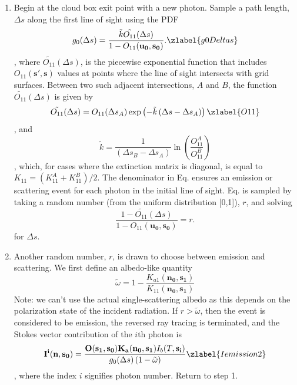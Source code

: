 \begin{enumerate}
\item
Begin at the cloud box exit point with a new photon. Sample a
  path length, $\Delta s$ along the first line of sight using the PDF
\begin{equation}
g_0(\Delta s)=\frac{\tilde{k}\tilde{O_{11}}(\Delta s)}
{1-O_{11}(\mathbf{u_0,s_0})}.
\zlabel{g0Deltas}
\end{equation}
, where $\tilde{O_{11}}(\Delta s)$, is the piecewise exponential
function that includes $O_{11}(\mathbf{s',s})$ values at points
where the line of sight intersects with grid surfaces.
Between two such adjacent intersections, $A$ and $B$, the function
$\tilde{O_{11}}(\Delta s)$ is given by
\begin{equation}
\tilde{O_{11}}(\Delta s)=O_{11}(\Delta s_A)\exp\left(-\tilde{k}\left(\Delta s-\Delta
s_A\right)\right)
\zlabel{O11}
\end{equation}
, and
\begin{equation}
\tilde{k}=\frac{1}{\left(\Delta s_B-\Delta s_A\right)}
\ln\left(\frac{O_{11}^A}{O_{11}^B}\right)
\end{equation}
, which, for cases where the extinction matrix is diagonal, is equal to $K_{11}=(K_{11}^A+K_{11}^B)/2$.
The denominator in Eq.  ensures an emission or scattering
event for each photon in the initial line of sight.
Eq.  is sampled by taking a random number (from the
uniform distribution [0,1]), $r$, and solving 
\begin{equation}
\frac{1-\tilde{O_{11}}(\Delta s)}{1-O_{11}(\mathbf{u_0,s_0})}=r.
\end{equation}
for $\Delta s$.
\item
Another random number, $r$, is drawn to choose between emission and scattering.  We first define an albedo-like quantity
\begin{equation}
\tilde{\omega}=1-\frac{K_{a1}(\mathbf{n_{0},s_{1}})}{K_{11}(\mathbf{n_{0},s_{1}})}
\end{equation}
Note: we can't use the actual single-scattering albedo as this depends
on the polarization state of the incident radiation.  If $r>\tilde{\omega}$, then the event is considered to be emission,
the reversed ray tracing is terminated, and the Stokes vector
contribution of the $i$th photon is
\begin{equation}
\mathbf{I^i(n,s_0)}=\frac{\mathbf{O(s_1,s_0)}\mathbf{K_a(n_0,s_1)}
  I_b(T,\mathbf{s_i})}{g_0(\Delta s) \left(1-\tilde{\omega}\right)}
\zlabel{Iemission2}
\end{equation}
, where the index $i$ signifies photon number. Return to step 1.


\end{enumerate}
